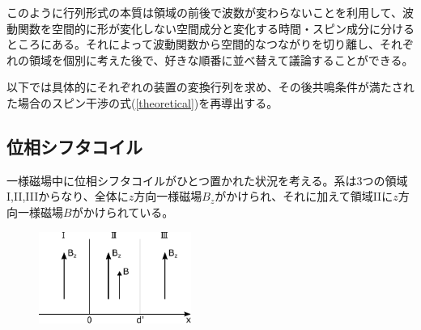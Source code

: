 このように行列形式の本質は領域の前後で波数が変わらないことを利用して、波動関数を空間的に形が変化しない空間成分と変化する時間・スピン成分に分けるところにある。それによって波動関数から空間的なつながりを切り離し、それぞれの領域を個別に考えた後で、好きな順番に並べ替えて議論することができる。

以下では具体的にそれぞれの装置の変換行列を求め、その後共鳴条件が満たされた場合のスピン干渉の式(\ref{theoretical})を再導出する。

\subsection{位相シフタコイル}
一様磁場中に位相シフタコイルがひとつ置かれた状況を考える。系は3つの領域I,II,IIIからなり、全体に$z$方向一様磁場$B_z$がかけられ、それに加えて領域IIに$z$方向一様磁場$B$がかけられている。
\begin{figure}[H]
\centering
\includegraphics[height=3cm]{matrix/phaseshifter.pdf}
\end{figure}

